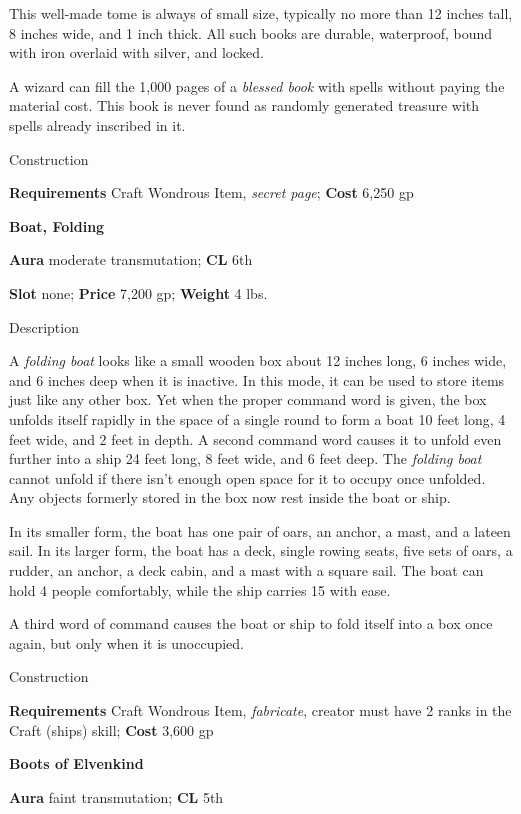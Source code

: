 This well-made tome is always of small size, typically no more than 12 inches tall, 8 inches wide, and 1 inch thick. All such books are durable, waterproof, bound with iron overlaid with silver, and locked.
				
A wizard can fill the 1,000 pages of a \textit{blessed book} with spells without paying the material cost. This book is never found as randomly generated treasure with spells already inscribed in it. 
				
Construction
				
\textbf{Requirements} Craft Wondrous Item, \textit{secret page}; \textbf{Cost }6,250 gp
				
\textbf{Boat, Folding}
				
\textbf{Aura} moderate transmutation;\textbf{ CL }6th
				
\textbf{Slot} none; \textbf{Price} 7,200 gp; \textbf{Weight} 4 lbs.
				
Description
				
A \textit{folding boat} looks like a small wooden box about 12 inches long, 6 inches wide, and 6 inches deep when it is inactive. In this mode, it can be used to store items just like any other box. Yet when the proper command word is given, the box unfolds itself rapidly in the space of a single round to form a boat 10 feet long, 4 feet wide, and 2 feet in depth. A second command word causes it to unfold even further into a ship 24 feet long, 8 feet wide, and 6 feet deep. The \textit{folding boat} cannot unfold if there isn't enough open space for it to occupy once unfolded. Any objects formerly stored in the box now rest inside the boat or ship.
				
In its smaller form, the boat has one pair of oars, an anchor, a mast, and a lateen sail. In its larger form, the boat has a deck, single rowing seats, five sets of oars, a rudder, an anchor, a deck cabin, and a mast with a square sail. The boat can hold 4 people comfortably, while the ship carries 15 with ease.
				
A third word of command causes the boat or ship to fold itself into a box once again, but only when it is unoccupied. 
				
Construction
				
\textbf{Requirements} Craft Wondrous Item, \textit{fabricate}, creator must have 2 ranks in the Craft (ships) skill; \textbf{Cost }3,600 gp
				
\textbf{Boots of Elvenkind}
				
\textbf{Aura} faint transmutation;\textbf{ CL }5th
				
